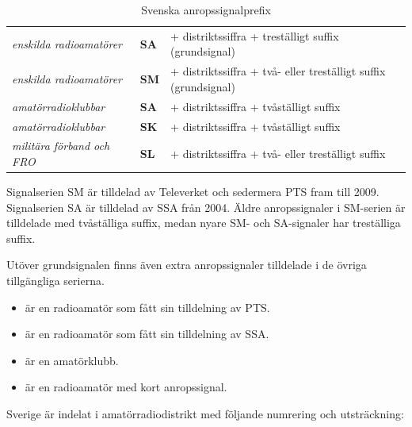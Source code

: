 \begin{table}[ht]
  \begin{center}
    \begin{tabular}{lll}
      \emph{enskilda radioamatörer} & \textbf{SA} &
      + distriktssiffra + treställigt suffix (grundsignal) \\
      \emph{enskilda radioamatörer} & \textbf{SM} &
      + distriktssiffra + två- eller treställigt suffix (grundsignal) \\
      \emph{amatörradioklubbar} & \textbf{SA} &
      + distriktssiffra + tvåställigt suffix \\
      \emph{amatörradioklubbar} & \textbf{SK} &
      + distriktssiffra + tvåställigt suffix \\
      \emph{militära förband och FRO} & \textbf{SL} &
      + distriktssiffra + två- eller treställigt suffix \\
    \end{tabular}
    \caption{Svenska anropssignalprefix}
    \label{tab:seprefix}
  \end{center}
\end{table}

Signalserien SM är tilldelad av Televerket och sedermera PTS fram till 2009.
Signalserien SA är tilldelad av SSA från 2004.
Äldre anropssignaler i SM-serien är tilldelade med tvåställiga suffix, medan
nyare SM- och SA-signaler har treställiga suffix.

Utöver grundsignalen finns även extra anropssignaler tilldelade i de övriga
tillgängliga serierna.

\begin{exempelbox}
	\begin{itemize}
		\item {} är en radioamatör som fått sin tilldelning av PTS.
		\item {} är en radioamatör som fått sin tilldelning av SSA.
		\item {} är en amatörklubb.
		\item {} är en radioamatör med kort anropssignal.
	\end{itemize}
\end{exempelbox}

\medskip

Sverige är indelat i amatörradiodistrikt med följande numrering och
utsträckning:

